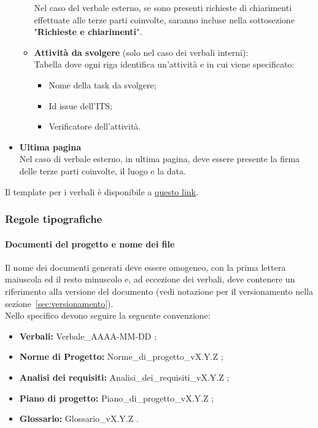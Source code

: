 \begin{itemize}
\begin{itemize}
            Nel caso del verbale esterno, se sono presenti richieste di chiarimenti effettuate alle terze parti coinvolte, saranno incluse nella sottosezione "\textbf{Richieste e chiarimenti}".
        
            \item \textbf{Attività da svolgere} (solo nel caso dei verbali interni): \\
            Tabella dove ogni riga identifica un'attività e in cui viene specificato:
                \begin{itemize}
                    \item Nome della task da svolgere;
                    \item Id issue dell'ITS;
                    \item Verificatore dell'attività.
                \end{itemize}
        \end{itemize}
    \item \textbf{Ultima pagina} \\
        Nel caso di verbale esterno, in ultima pagina, deve essere presente la firma delle terze parti coinvolte, il luogo e la data.
\end{itemize}

Il template per i verbali è disponibile a \href{https://github.com/ByteOps-swe/Sorgente-documenti/tree/main/Documents/Verbali/Templates}{questo link}.

\subsubsection{Regole tipografiche}
\paragraph*{Documenti del progetto e nome dei file}\label{sec:NomeFile}
Il nome dei documenti generati deve essere omogeneo, con la prima lettera maiuscola ed il resto minuscolo e, ad eccezione dei verbali, deve contenere un riferimento alla versione del documento (vedi notazione per il versionamento nella sezione~\ref{sec:versionamento}). \\
Nello specifico devono seguire la seguente convenzione:
\begin{itemize}
    \item \textbf{Verbali:} Verbale\_AAAA-MM-DD ;
    \item \textbf{Norme di Progetto:} Norme\_di\_progetto\_vX.Y.Z ;
    \item \textbf{Analisi dei requisiti:} Analisi\_dei\_requisiti\_vX.Y.Z ;
    \item \textbf{Piano di progetto:} Piano\_di\_progetto\_vX.Y.Z ;
    \item \textbf{Glossario:} Glossario\_vX.Y.Z .
\end{itemize}

